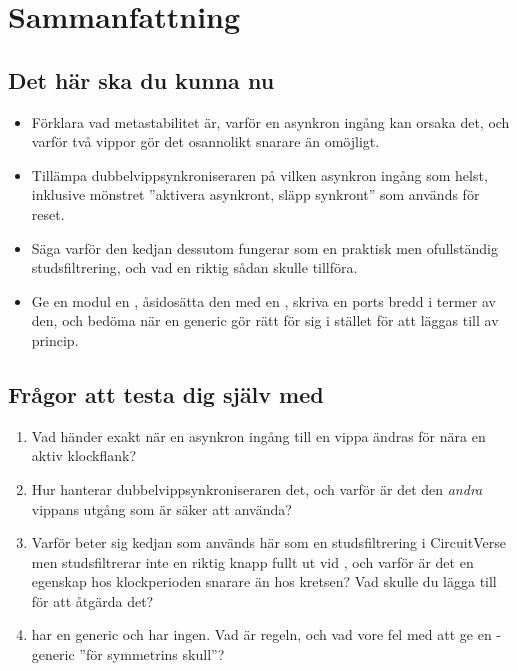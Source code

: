 
\section{Sammanfattning}
\label{c4:sec:review}

\subsection*{Det här ska du kunna nu}
\begin{itemize}
  \item Förklara vad metastabilitet är, varför en asynkron ingång kan orsaka det, och varför två
    vippor gör det osannolikt snarare än omöjligt.
  \item Tillämpa dubbelvippsynkroniseraren på vilken asynkron ingång som helst, inklusive mönstret
    ”aktivera asynkront, släpp synkront” som används för reset.
  \item Säga varför den kedjan dessutom fungerar som en praktisk men ofullständig studsfiltrering,
    och vad en riktig sådan skulle tillföra.
  \item Ge en modul en , åsidosätta den med en , skriva en ports
    bredd i termer av den, och bedöma när en generic gör rätt för sig i stället för att läggas till
    av princip.
\end{itemize}

\subsection*{Frågor att testa dig själv med}
\begin{enumerate}
  \item Vad händer exakt när en asynkron ingång till en vippa ändras för nära en aktiv klockflank?
  \item Hur hanterar dubbelvippsynkroniseraren det, och varför är det den \emph{andra} vippans
    utgång som är säker att använda?
  \item Varför beter sig kedjan som används här som en studsfiltrering i CircuitVerse men
    studsfiltrerar inte en riktig knapp fullt ut vid , och varför är det en egenskap
    hos klockperioden snarare än hos kretsen? Vad skulle du lägga till för att åtgärda det?
  \item {} har en generic och  har ingen. Vad är regeln, och vad
    vore fel med att ge  en -generic ”för symmetrins skull”?
\end{enumerate}

